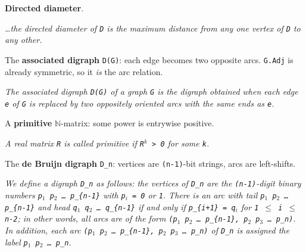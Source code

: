 \begin{definition}[dirDiameter]
\label{Digraph.dirDiameter}
\leanok
{}
\textbf{Directed diameter}.

\emph{\dots{}the directed diameter of \texttt{D} is the
maximum distance from any one vertex of \texttt{D} to any other.}
\end{definition}

\begin{definition}
\label{SimpleGraph.associatedDigraph}
\leanok
The \textbf{associated digraph} \texttt{D(G)}: each edge becomes two opposite arcs.
\texttt{G.Adj} is already symmetric, so it \emph{is} the arc relation.

\emph{The associated digraph \texttt{D(G)}
of a graph \texttt{G} is the digraph obtained when each edge \texttt{e} of \texttt{G} is
replaced by two
oppositely oriented arcs with the same ends as \texttt{e}.}
\end{definition}

\begin{definition}
\label{Matrix.IsPrimitive}
\leanok
A \textbf{primitive} $\mathbb{N}$-matrix: some power is entrywise positive.

\emph{A real matrix \texttt{R} is called primitive
if \texttt{R$^{k}$ > 0} for some \texttt{k}.}
\end{definition}

\begin{definition}
\label{deBruijnDigraph}
\leanok
The \textbf{de Bruijn digraph} \texttt{D\_n}: vertices are \texttt{(n-1)}-bit strings,
arcs are left-shifts.

\emph{We define a digraph \texttt{D\_n} as follows:
the vertices of \texttt{D\_n} are the \texttt{(n-1)}-digit binary numbers
\texttt{p$_{1}$ p$_{2}$ \dots{} p\_\{n-1\}} with
\texttt{p$_{i}$ = 0} or \texttt{1}.  There is an arc with tail \texttt{p$_{1}$ p$_{2}$ \dots{} p\_\{n-1\}} and head
\texttt{q$_{1}$ q$_{2}$ \dots{} q\_\{n-1\}} if and only if \texttt{p\_\{i+1\} = q$_{i}$} for \texttt{1 $\le$ i $\le$ n-2}; in other words,
all arcs are of the form \texttt{(p$_{1}$ p$_{2}$ \dots{} p\_\{n-1\}, p$_{2}$ p$_{3}$
\dots{} p\_n)}. In addition, each arc
\texttt{(p$_{1}$ p$_{2}$ \dots{} p\_\{n-1\}, p$_{2}$ p$_{3}$ \dots{} p\_n)} of \texttt{D\_n} is assigned the label \texttt{p$_{1}$ p$_{2}$ \dots{} p\_n}.}
\end{definition}

